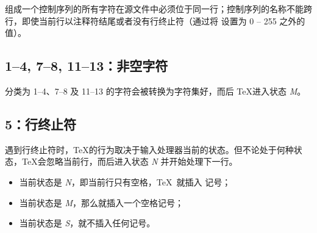 \documentclass{book}
\begin{document}
组成一个控制序列的所有字符在源文件中必须位于同一行；控制序列的名称不能跨行，即使当前行以注释符结尾或者没有行终止符（通过将  设置为 0 -- 255 之外的值）。

\subsection{1–4, 7–8, 11–13：非空字符}

分类为 1--4、7--8 及 11--13 的字符会被转换为字符集好，而后 \TeX 进入状态 {\itshape M}。

\subsection{5：行终止符}

遇到行终止符时，\TeX 的行为取决于输入处理器当前的状态。但不论处于何种状态，\TeX 会忽略当前行，而后进入状态 {\itshape N} 并开始处理下一行。
\begin{itemize}
  \item 当前状态是 {\itshape N}，即当前行只有空格，\TeX\ 就插入  记号；
  \item 当前状态是 {\itshape M}，那么就插入一个空格记号；
  \item 当前状态是 {\itshape S}，就不插入任何记号。
\end{itemize}
\end{document}

